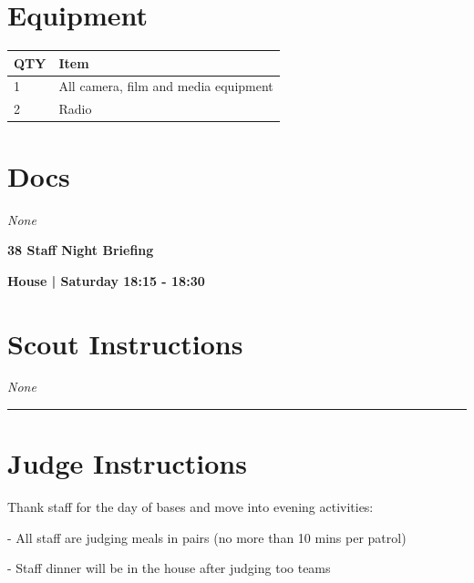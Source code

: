 \documentclass[10pt]{article}
\newcommand{\newtitle}[1]{\begin{center}{\Huge\bfseries #1 }\\ \vspace{5mm}\end{center}}
\newcommand{\newsubtitle}[1]{\begin{center}{\color{grey}\Large\bfseries #1 }\\ \vspace{5mm}\end{center}}
\begin{document}
	\begin{multicols}{2}

		\section*{\faWrench \: Equipment}

		
	\begin{center}
			\begin{tabular}{p{2cm}p{4cm}}


				\textbf{QTY} & \textbf{Item} \\\toprule
												1&All camera, film and media equipment\\\midrule
												2&Radio\\\midrule
								\end{tabular}

			\end{center}

		
		\vfill\null
		\columnbreak

			\section*{\faFile \: Docs}
		 	\textit{None}
	

		\vfill\null

		\end{multicols}



	\vspace{1cm}


	\clearpage
		\newtitle{38 Staff Night Briefing }
	\newsubtitle{House | Saturday 18:15 - 18:30}
		\setcounter{section}{37}
	\section*{Scout Instructions}
		\textit{None}
	
	\vspace{0.5cm}
	\hrule
	\vspace{0.5cm}

		\section*{Judge Instructions}
		Thank staff for the day of bases and move into evening activities:

- All staff are judging meals in pairs (no more than 10 mins per patrol)

- Staff dinner will be in the house after judging too teams
\end{document}
